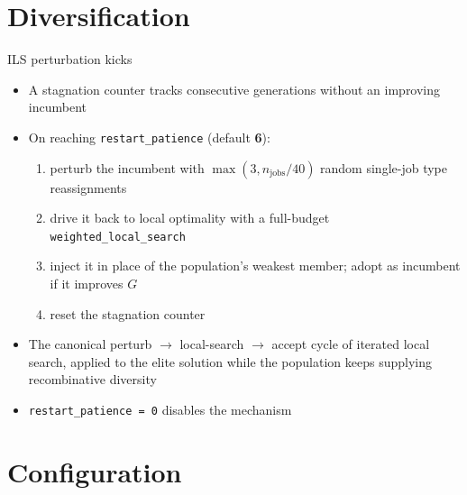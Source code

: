 \documentclass[aspectratio=169,t]{beamer}
\newcommand{\code}[1]{\texttt{#1}}
\begin{document}
\section{Diversification}

\begin{frame}{ILS perturbation kicks}
  \begin{itemize}
    \item A stagnation counter tracks consecutive generations without an
      improving incumbent
    \item On reaching \code{restart\_patience} (default \textbf{6}):
    \begin{enumerate}
      \item perturb the incumbent with $\max(3, n_{\text{jobs}}/40)$ random
        single-job type reassignments
      \item drive it back to local optimality with a full-budget
        \code{weighted\_local\_search}
      \item inject it in place of the population's weakest member; adopt as
        incumbent if it improves $G$
      \item reset the stagnation counter
    \end{enumerate}
    \item The canonical \alert{perturb $\to$ local-search $\to$ accept} cycle
      of iterated local search, applied to the elite solution while the
      population keeps supplying recombinative diversity
    \item \code{restart\_patience = 0} disables the mechanism
  \end{itemize}
\end{frame}

\section{Configuration}
\end{document}
